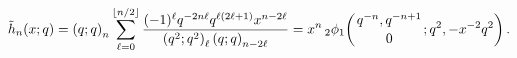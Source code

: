 \[\mathop{\tilde{h}_{n}\/}\nolimits\!\left(x;q\right)=\left(q;q\right)_{n}\sum_{%
\ell=0}^{\left\lfloor n/2\right\rfloor}\frac{(-1)^{\ell}q^{-2n\ell}q^{\ell(2%
\ell+1)}x^{n-2\ell}}{\left(q^{2};q^{2}\right)_{\ell}\left(q;q\right)_{n-2\ell}%
}=x^{n}\mathop{{{}_{2}\phi_{1}}\/}\nolimits\!\left({q^{-n},q^{-n+1}\atop 0};q^%
{2},-x^{-2}q^{2}\right).\]